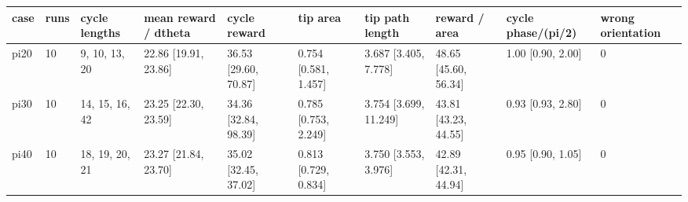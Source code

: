 \begin{tabular}{llllllllll}
\toprule
case & runs & cycle lengths & mean reward / dtheta & cycle reward & tip area & tip path length & reward / area & cycle phase/(pi/2) & wrong orientation \\
\midrule
pi20 & 10 & 9, 10, 13, 20 & 22.86 [19.91, 23.86] & 36.53 [29.60, 70.87] & 0.754 [0.581, 1.457] & 3.687 [3.405, 7.778] & 48.65 [45.60, 56.34] & 1.00 [0.90, 2.00] & 0 \\
pi30 & 10 & 14, 15, 16, 42 & 23.25 [22.30, 23.59] & 34.36 [32.84, 98.39] & 0.785 [0.753, 2.249] & 3.754 [3.699, 11.249] & 43.81 [43.23, 44.55] & 0.93 [0.93, 2.80] & 0 \\
pi40 & 10 & 18, 19, 20, 21 & 23.27 [21.84, 23.70] & 35.02 [32.45, 37.02] & 0.813 [0.729, 0.834] & 3.750 [3.553, 3.976] & 42.89 [42.31, 44.94] & 0.95 [0.90, 1.05] & 0 \\
\bottomrule
\end{tabular}
